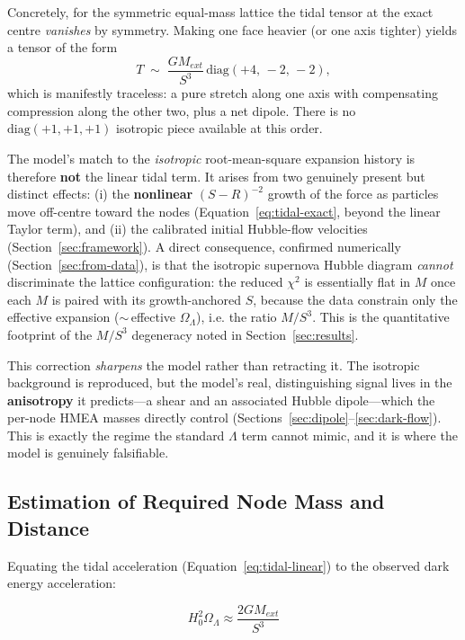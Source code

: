 \documentclass{article}
\begin{document}
Concretely, for the symmetric equal-mass lattice the tidal tensor at the exact centre \emph{vanishes} by symmetry. Making one face heavier (or one axis tighter) yields a tensor of the form
\begin{equation}
T \;\sim\; \frac{G M_{ext}}{S^3}\,\mathrm{diag}(+4,\,-2,\,-2),
\label{eq:traceless-shear}
\end{equation}
which is manifestly traceless: a pure stretch along one axis with compensating compression along the other two, plus a net dipole. There is no $\mathrm{diag}(+1,+1,+1)$ isotropic piece available at this order.

The model's match to the \emph{isotropic} root-mean-square expansion history is therefore \textbf{not} the linear tidal term. It arises from two genuinely present but distinct effects: (i) the \textbf{nonlinear} $(S-R)^{-2}$ growth of the force as particles move off-centre toward the nodes (Equation~\ref{eq:tidal-exact}, beyond the linear Taylor term), and (ii) the calibrated initial Hubble-flow velocities (Section~\ref{sec:framework}). A direct consequence, confirmed numerically (Section~\ref{sec:from-data}), is that the isotropic supernova Hubble diagram \emph{cannot} discriminate the lattice configuration: the reduced $\chi^2$ is essentially flat in $M$ once each $M$ is paired with its growth-anchored $S$, because the data constrain only the effective expansion ($\sim$\,effective $\Omega_\Lambda$), i.e. the ratio $M/S^3$. This is the quantitative footprint of the $M/S^3$ degeneracy noted in Section~\ref{sec:results}.

This correction \emph{sharpens} the model rather than retracting it. The isotropic background is reproduced, but the model's real, distinguishing signal lives in the \textbf{anisotropy} it predicts---a shear and an associated Hubble dipole---which the per-node HMEA masses directly control (Sections~\ref{sec:dipole}--\ref{sec:dark-flow}). This is exactly the regime the standard $\Lambda$ term cannot mimic, and it is where the model is genuinely falsifiable.

\subsection{Estimation of Required Node Mass and Distance}
\label{sec:estimation}
Equating the tidal acceleration (Equation~\ref{eq:tidal-linear}) to the observed dark energy acceleration:

\begin{equation}
H_0^2 \Omega_\Lambda \approx \frac{2 G M_{ext}}{S^3}
\label{eq:matching}
\end{equation}
\end{document}
